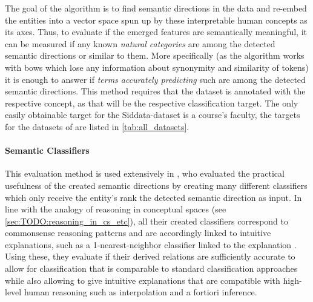 The goal of the algorithm is to find semantic directions in the data and re-embed the entities into a vector space spun up by these interpretable human concepts as its axes. Thus, to evaluate if the emerged features are semantically meaningful, it can be measured if any known \textit{natural categories} are among the detected semantic directions or similar to them. More specifically (as the algorithm works with \glspl{bow} which lose any information about synonymity and similarity of tokens) %
it is enough to answer if \emph{terms accurately predicting} such are among the detected semantic directions. This method requires that the dataset is annotated with the respective concept, as that will be the respective classification target. The only easily obtainable target for the Siddata-dataset is a course's faculty, the targets for the datasets of \mainalgos are listed in \autoref{tab:all_datasets}.

\paragraph{Semantic Classifiers} This evaluation method is used extensively in \cite{Derrac2015}, who evaluated the practical usefulness of the created semantic directions by creating many different classifiers which only receive the entity's \gls{rank} \wrt the detected semantic direction as input. In line with the analogy of reasoning in conceptual spaces (see \ref{sec:TODO:reasoning_in_cs_etc}), all their created classifiers correspond to commonsense reasoning patterns and are accordingly linked to intuitive explanations, such as a 1-nearest-neighbor classifier linked to the explanation \textit{}. Using these, they evaluate if their derived relations are sufficiently accurate to allow for classification that is comparable to standard classification approaches while also allowing to give intuitive explanations that are compatible with high-level human reasoning such as interpolation and a fortiori inference.

